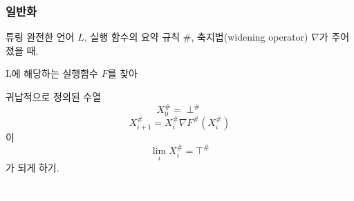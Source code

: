 \documentclass{simplesnt}
\begin{document}
\begin{frame}[c]
  \frametitle{일반화}

  튜링 완전한 언어 $L$, 실행 함수의 요약 규칙 $\#$, 축지법(widening operator) $\nabla$가 주어졌을 때,

  L에 해당하는 실행함수 $F$를 찾아

  귀납적으로 정의된 수열
\[
    X_0^{\#} = \perp^{\#}
\]
\[
    X_{i+1}^{\#} = X_i^{\#} \nabla F^{\#}(X_i^{\#})
\]
  이 
\[
    \lim_{i} X_i^{\#} = \top^{\#}
\]
  가 되게 하기.
  

\end{frame}



\addtocounter{framenumber}{-1} %
\appendix
\begin{frame}[c] %
  \centering
  {\Large \textcolor{white}{감사합니다}}
\end{frame}
\end{document}
